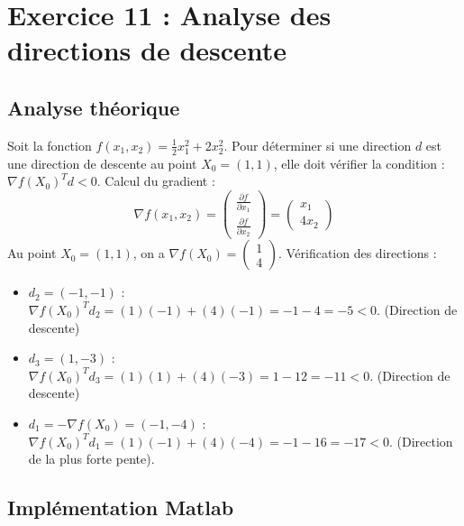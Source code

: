 \documentclass[a4paper,12pt]{article}
\begin{document}
	\tableofcontents
	
	\pagebreak
	
	\section{Exercice 11 : Analyse des directions de descente}
	
	\subsection{Analyse théorique}
	
	Soit la fonction $f(x_1, x_2) = \frac{1}{2}x_1^2 + 2x_2^2$. Pour déterminer si une direction $d$ est une direction de descente au point $X_0 = (1, 1)$, elle doit vérifier la condition : $\nabla f(X_0)^T d < 0$. Calcul du gradient :
	$$
	\nabla f(x_1, x_2) =
	\begin{pmatrix}
	\frac{\partial f}{\partial x_1} \\
	\frac{\partial f}{\partial x_2}
	\end{pmatrix}
	=
	\begin{pmatrix}
	x_1 \\
	4x_2
	\end{pmatrix}
	$$
	Au point $X_0 = (1, 1)$, on a $\nabla f(X_0) =
	\begin{pmatrix}
	1 \\
	4
	\end{pmatrix}$.
	Vérification des directions :
	
	\begin{itemize}
		\item[$\bullet$] $d_2 = (-1, -1)$ :\\
		$\nabla f(X_0)^T d_2 = (1)(-1) + (4)(-1) = -1 - 4 = -5 < 0$. (Direction de descente)
		
		\item[$\bullet$] $d_3 = (1, -3)$ :\\
		$\nabla f(X_0)^T d_3 = (1)(1) + (4)(-3) = 1 - 12 = -11 < 0$. (Direction de descente)
		
		\item[$\bullet$] $d_1 = -\nabla f(X_0) = (-1, -4)$ :\\
		$\nabla f(X_0)^T d_1 = (1)( -1) + (4)(-4) = -1 - 16 = -17 < 0$. (Direction de la plus forte pente).
	\end{itemize}
	
	\subsection{Implémentation Matlab}
	
\end{document}
